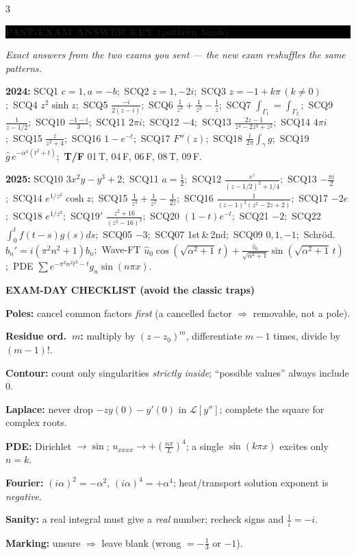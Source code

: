 \documentclass[a4paper,8pt]{extarticle}
\newcommand{\topic}[2]{%
  \vspace{4.5pt}%
  {\colorbox{#1}{\parbox{\dimexpr\columnwidth-2\fboxsep}{\color{white}\bfseries\footnotesize #2}}}\par\vspace{2.5pt}}
\newcommand{\Lap}{\mathcal{L}}
\begin{document}
\begin{multicols}{3}
\topic{black}{PAST-EXAM ANSWER KEY (pattern bank)}
{\itshape Exact answers from the two exams you sent — the new exam reshuffles the same patterns.}\par\smallskip
\textbf{\textcolor{cA}{2024:}} SCQ1 $c{=}1,a{=}{-}b$;\ SCQ2 $z{=}1,{-}2i$;\ SCQ3 $z{=}{-}1{+}k\pi\,(k{\ne}0)$;\ SCQ4 $z^2\sinh z$;\ SCQ5 $\frac{-i}{2(z-i)}$;\ SCQ6 $\frac1{z^3}{+}\frac1{z^2}{-}\frac1z$;\ SCQ7 $\int_{\Gamma_1}{=}\int_{\Gamma_2}$;\ SCQ9 $\frac1{z-1/2}$;\ SCQ10 $\frac{-1-i}3$;\ SCQ11 $2\pi i$;\ SCQ12 $-4$;\ SCQ13 $\frac{2z-1}{z^4-2z^3+z^2}$;\ SCQ14 $4\pi i$;\ SCQ15 $\frac z{z^2+4}$;\ SCQ16 $1{-}e^{-t}$;\ SCQ17 $F''(z)$;\ SCQ18 $\frac i{2\pi}\!\int_\gamma\! g$;\ SCQ19 $\hat g\,e^{-\alpha^4(t^2+t)}$;\ \textbf{T/F} 01\,T, 04\,F, 06\,F, 08\,T, 09\,F.\par\smallskip
\textbf{\textcolor{cA}{2025:}} SCQ10 $3x^2y{-}y^3{+}2$;\ SCQ11 $a{=}\frac12$;\ SCQ12 $\frac{e^z}{(z-1/2)^2+1/4}$;\ SCQ13 $-\frac{\pi i}2$;\ SCQ14 $e^{1/z^2}\!\cosh z$;\ SCQ15 $\frac1{z^3}{+}\frac1{z^2}{-}\frac1{2z}$;\ SCQ16 $\frac1{(z-1)^2(z^2-2z+2)}$;\ SCQ17 $-2e$;\ SCQ18 $e^{1/z^2}$;\ SCQ19$'$ $\frac{z^2+16}{(z^2-16)^2}$;\ SCQ20 $(1{-}t)e^{-t}$;\ SCQ21 $-2$;\ SCQ22 $\int_0^t\! f(t{-}s)g(s)ds$;\ SCQ05 $-3$;\ SCQ07 1st\,\&\,2nd;\ SCQ09 $0,1,{-}1$;\ Schröd. $b_n'{=}i(\pi^2n^2{+}1)b_n$;\ Wave-FT $\hat u_0\cos(\sqrt{\alpha^2{+}1}\,t){+}\frac{\hat v_0}{\sqrt{\alpha^2+1}}\sin(\sqrt{\alpha^2{+}1}\,t)$;\ PDE $\sum e^{-\pi^2n^2t^2-t}g_n\sin(n\pi x)$.

\topic{cWarn}{EXAM-DAY CHECKLIST (avoid the classic traps)}
\begin{recipe}
\item \textbf{Poles:} cancel common factors \emph{first} (a cancelled factor $\Rightarrow$ removable, not a pole).
\item \textbf{Residue ord.\ $m$:} multiply by $(z{-}z_0)^m$, differentiate $m{-}1$ times, divide by $(m{-}1)!$.
\item \textbf{Contour:} count only singularities \emph{strictly inside}; ``possible values'' always include $0$.
\item \textbf{Laplace:} never drop $-zy(0){-}y'(0)$ in $\Lap[y'']$; complete the square for complex roots.
\item \textbf{PDE:} Dirichlet $\to\sin$; $u_{xxxx}\to{+}(\frac{n\pi}L)^4$; a single $\sin(k\pi x)$ excites only $n{=}k$.
\item \textbf{Fourier:} $(i\alpha)^2{=}{-}\alpha^2$, $(i\alpha)^4{=}{+}\alpha^4$; heat/transport solution exponent is \emph{negative}.
\item \textbf{Sanity:} a real integral must give a \emph{real} number; recheck signs and $\tfrac1i{=}{-}i$.
\item \textbf{Marking:} unsure $\Rightarrow$ leave blank (wrong $=-\tfrac13$ or $-1$).
\end{recipe}

\end{multicols}
\end{document}
